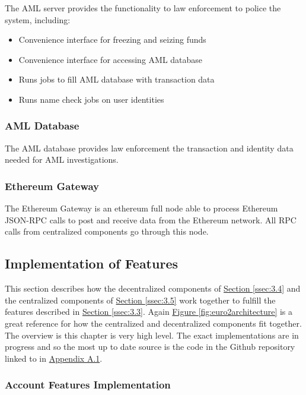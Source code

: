 \documentclass[a4paper,12pt]{article} %
\newcommand{\hyperfigureref}[1]{\hyperref[#1]{Figure \ref{#1}}}
\newcommand{\hypersectionref}[1]{\hyperref[#1]{Section \ref{#1}}}
\begin{document}
{The AML server provides the functionality to law enforcement to police the system, including:

\begin{itemize}
	\item Convenience interface for freezing and seizing funds
	\item Convenience interface for accessing AML database
	\item Runs jobs to fill AML database with transaction data
	\item Runs name check jobs on user identities
\end{itemize}

\subsubsection{AML Database} \label{sssec:3.5:amlDatabase}

The AML database provides law enforcement the transaction and identity data needed for AML investigations.

\subsubsection{Ethereum Gateway} \label{sssec:3.5:ethereumGateway}

The Ethereum Gateway is an ethereum full node able to process Ethereum JSON-RPC calls to post and receive data from the Ethereum network\cite{ethereumJsonRpc}. All RPC calls from centralized components go through this node.

\subsection{Implementation of Features} \label{ssec:3.6}

This section describes how the decentralized components of \hypersectionref{ssec:3.4} and the centralized components of \hypersectionref{ssec:3.5} work together to fulfill the features described in \hypersectionref{ssec:3.3}. Again \hyperfigureref{fig:euro2architecture} is a great reference for how the centralized and decentralized components fit together. The overview is this chapter is very high level. The exact implementations are in progress and so the most up to date source is the code in the Github repository linked to in \hyperref[ssec:a.1]{Appendix A.1}.

\subsubsection{Account Features Implementation} \label{sssec:3.6:account}

}
\end{document}
